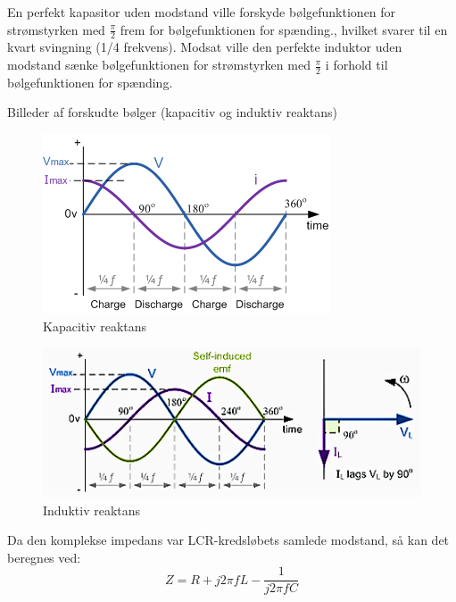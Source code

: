 En perfekt kapasitor uden modstand ville forskyde bølgefunktionen for strømstyrken med $\frac{\pi}{2}$ frem for bølgefunktionen for spænding., hvilket svarer til en kvart svingning (1/4 frekvens). Modsat ville den perfekte induktor uden modstand sænke bølgefunktionen for strømstyrken med $\frac{\pi}{2}$ i forhold til bølgefunktionen for spænding.

Billeder af forskudte bølger (kapacitiv og induktiv reaktans)
\begin{figure}[H]
\centering
\includegraphics[scale=1]{Vildledning/Schematics/Kapacitiv_reaktans}
\caption{Kapacitiv reaktans}
\label{kreaktans}
\end{figure}

\begin{figure}[H]
\centering
\includegraphics[scale=0.8]{Vildledning/Schematics/Induktiv_reaktans}
\caption{Induktiv reaktans}
\label{ireaktans}
\end{figure}

Da den komplekse impedans var LCR-kredsløbets samlede modstand, så kan det beregnes ved:
\begin{equation}
Z = R + j 2 \pi f L - \frac{1}{j 2 \pi f C}
\end{equation}
\newpage